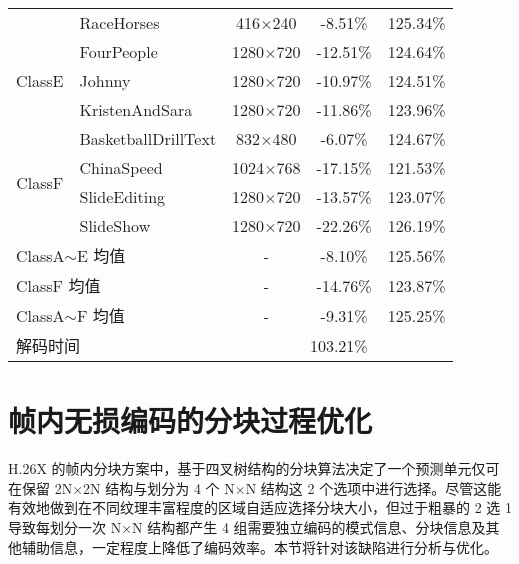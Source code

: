 \begin{table}[!p]
\begin{tabular}{@{}clccc@{}}
                                               & RaceHorses                   & 416$\times$240   & -8.51\%  & 125.34\% \\
        \multirow{3}{*}{ClassE}                & FourPeople                   & 1280$\times$720  & -12.51\% & 124.64\% \\
                                               & Johnny                       & 1280$\times$720  & -10.97\% & 124.51\% \\
                                               & KristenAndSara               & 1280$\times$720  & -11.86\% & 123.96\% \\
        \multirow{4}{*}{ClassF}                & BasketballDrillText          & 832$\times$480   & -6.07\%  & 124.67\% \\
                                               & ChinaSpeed                   & 1024$\times$768  & -17.15\% & 121.53\% \\
                                               & SlideEditing                 & 1280$\times$720  & -13.57\% & 123.07\% \\
                                               & SlideShow                    & 1280$\times$720  & -22.26\% & 126.19\% \\ \midrule
        \multicolumn{2}{l}{ClassA$\sim$E 均值} & -                            & -8.10\%          & 125.56\%            \\ \midrule
        \multicolumn{2}{l}{ClassF 均值}        & -                            & -14.76\%         & 123.87\%            \\ \midrule
        \multicolumn{2}{l}{ClassA$\sim$F 均值} & -                            & -9.31\%          & 125.25\%            \\ \midrule
        \multicolumn{2}{l}{解码时间}           & \multicolumn{3}{c}{103.21\%}                                          \\ \bottomrule
    \end{tabular}
\end{table}

\section{帧内无损编码的分块过程优化}
\label{cha:L-BPSec}
H.26X 的帧内分块方案中，基于四叉树结构的分块算法决定了一个预测单元仅可在保留 2N$\times$2N 结构与划分为 4 个 N$\times$N 结构这 2 个选项中进行选择。尽管这能有效地做到在不同纹理丰富程度的区域自适应选择分块大小，但过于粗暴的 2 选 1 导致每划分一次 N$\times$N 结构都产生 4 组需要独立编码的模式信息、分块信息及其他辅助信息，一定程度上降低了编码效率。本节将针对该缺陷进行分析与优化。

